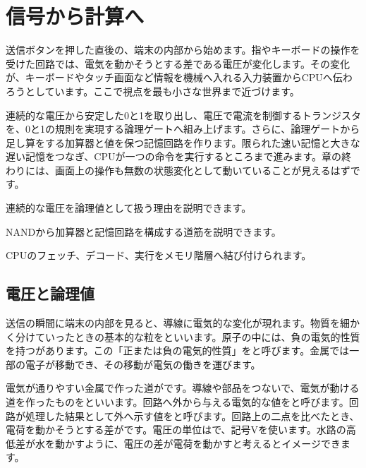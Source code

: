 \chapter{信号から計算へ}
\label{chap:digital-computer}

\begin{chapterabstract}
送信ボタンを押した直後の、端末の内部から始めます。指やキーボードの操作を受けた回路では、電気を動かそうとする差である電圧が変化します。その変化が、キーボードやタッチ画面など情報を機械へ入れる入力装置からCPUへ伝わろうとしています。ここで視点を最も小さな世界まで近づけます。

連続的な電圧から安定した0と1を取り出し、電圧で電流を制御するトランジスタを、0と1の規則を実現する論理ゲートへ組み上げます。さらに、論理ゲートから足し算をする加算器と値を保つ記憶回路を作ります。限られた速い記憶と大きな遅い記憶をつなぎ、CPUが一つの命令を実行するところまで進みます。章の終わりには、画面上の操作も無数の状態変化として動いていることが見えるはずです。
\end{chapterabstract}

\begin{learninggoals}
  \item 連続的な電圧を論理値として扱う理由を説明できます。
  \item NANDから加算器と記憶回路を構成する道筋を説明できます。
  \item CPUのフェッチ、デコード、実行をメモリ階層へ結び付けられます。
\end{learninggoals}



\section{電圧と論理値}
\label{sec:01-digital-computer-01}

送信の瞬間に端末の内部を見ると、導線に電気的な変化が現れます。物質を細かく分けていったときの基本的な粒をといいます。原子の中には、負の電気的性質を持つがあります。この「正または負の電気的性質」をと呼びます。金属では一部の電子が移動でき、その移動が電気の働きを運びます。

電気が通りやすい金属で作った道がです。導線や部品をつないで、電気が動ける道を作ったものをといいます。回路へ外から与える電気的な値をと呼びます。回路が処理した結果として外へ示す値をと呼びます。回路上の二点を比べたとき、電荷を動かそうとする差がです。電圧の単位はで、記号Vを使います。水路の高低差が水を動かすように、電圧の差が電荷を動かすと考えるとイメージできます。

